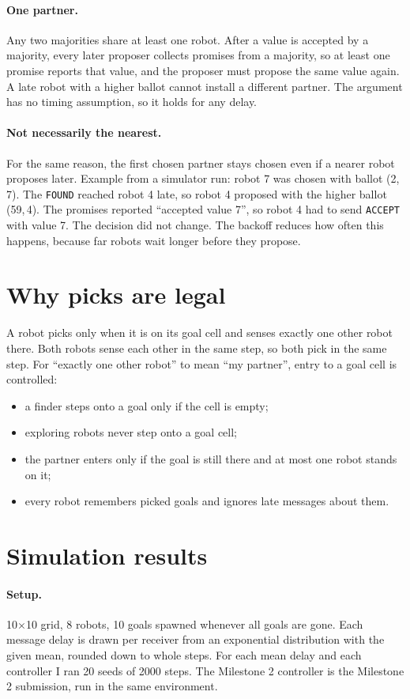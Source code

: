 \documentclass[11pt,a4paper]{article}
\begin{document}
\paragraph{One partner.} Any two majorities share at least one robot. After a
value is accepted by a majority, every later proposer collects promises from a
majority, so at least one promise reports that value, and the proposer must
propose the same value again. A late robot with a higher ballot cannot install a
different partner. The argument has no timing assumption, so it holds for any
delay.

\paragraph{Not necessarily the nearest.} For the same reason, the first chosen
partner stays chosen even if a nearer robot proposes later. Example from a
simulator run: robot 7 was chosen with ballot (2,\,7). The \texttt{FOUND} reached
robot 4 late, so robot 4 proposed with the higher ballot (59,\,4). The promises
reported ``accepted value 7'', so robot 4 had to send \texttt{ACCEPT} with value 7.
The decision did not change. The backoff reduces how often this happens, because
far robots wait longer before they propose.

\section{Why picks are legal}
A robot picks only when it is on its goal cell and senses exactly one other robot
there. Both robots sense each other in the same step, so both pick in the same
step. For ``exactly one other robot'' to mean ``my partner'', entry to a goal cell
is controlled:
\begin{itemize}
\item a finder steps onto a goal only if the cell is empty;
\item exploring robots never step onto a goal cell;
\item the partner enters only if the goal is still there and at most one robot
stands on it;
\item every robot remembers picked goals and ignores late messages about them.
\end{itemize}

\section{Simulation results}\label{sec:results}
\paragraph{Setup.} 10$\times$10 grid, 8 robots, 10 goals spawned whenever all goals
are gone. Each message delay is drawn per receiver from an exponential distribution
with the given mean, rounded down to whole steps. For each mean delay and each
controller I ran 20 seeds of 2000 steps. The Milestone 2 controller is the
Milestone 2 submission, run in the same environment.
\end{document}
